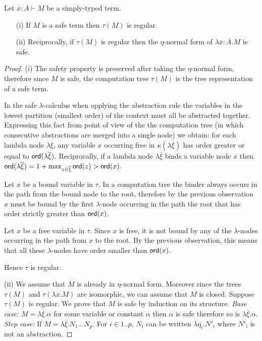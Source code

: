 \begin{lem}
\label{lem:regularity}
Let $\overline{x}:\overline{A} \vdash M$ be a simply-typed term.
\begin{itemize}
\item[(i)] If $M$ is a safe term then $\tau(M)$ is regular.
\item[(ii)] Reciprocally, if $\tau(M)$ is regular then the $\eta$-normal form of $\lambda \overline{x}:\overline{A} . M$ is safe.
\end{itemize}
\end{lem}
\begin{proof}
(i) The safety property is preserved after taking the $\eta$-normal form, therefore since
$M$ is safe, the computation tree $\tau(M)$ is the tree representation of a safe term.

In the safe $\lambda$-calculus when applying the abstraction rule the variables in the lowest partition (smallest order) of the context
must all be abstracted together.
Expressing this fact from point of view of the the computation tree
(in which consecutive abstractions are merged into a single node) we obtain:
for each lambda node $\lambda \overline{\xi}$, any variable $x$ occurring free in $\kappa(\lambda \overline{\xi})$
has order greater or equal to ${\sf ord}(\lambda \overline{\xi})$. Reciprocally, if a lambda node $\lambda \overline{\xi}$
binds a variable node $x$ then ${\sf ord}(\lambda \overline{\xi}) = 1+\max_{z\in\overline{\xi}} {\sf ord}(z) > {\sf ord}(x)$.

Let $x$ be a bound variable in $\tau$.
In a computation tree the binder always occurs in the path from the bound node to the root,
therefore by the previous observation $x$ must be bound by the first $\lambda$-node occurring in the path the root
that has order strictly greater than ${\sf ord}(x)$.

Let $x$ be a free variable in $\tau$. Since $x$ is free, it is not bound by any of the $\lambda$-nodes occurring in the path from $x$ to the root.
By the previous observation, this means that all these $\lambda$-nodes have order smaller than ${\sf ord}(x)$.

Hence $\tau$ is regular.

(ii) We assume that $M$ is already in $\eta$-normal form. Moreover since the trees $\tau(M)$ and $\tau(\lambda \overline{x} . M)$ are isomorphic, we can assume that
$M$ is closed. Suppose $\tau(M)$ is regular.
We prove that $M$ is safe by induction on its structure.
\emph{Base case:} $M = \lambda \overline{\xi} . \alpha$ for some variable or constant $\alpha$ then $\alpha$ is safe therefore so is $\lambda \overline{\xi} . \alpha$.
\emph{Step case:} If $M = \lambda \overline{\xi} . N_1 \ldots N_p$. For $i \in 1..p$, $N_i$ can be written $\lambda \overline{\eta_i} . N'_i$ where $N'_i$
is not an abstraction.


\end{proof}
